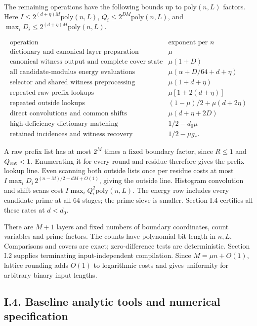 The remaining operations have the following bounds up to \(\mathrm{poly}(n,L)\) factors. Here \(I\le2^{(d+\eta)M}\mathrm{poly}(n,L)\), \(Q_i\le2^{DM}\mathrm{poly}(n,L)\), and \(\max_iD_i\le2^{(d+\eta)M}\mathrm{poly}(n,L)\).

\[
\begin{array}{c|c}
\text{operation}&\text{exponent per }n\\ \hline
\text{dictionary and canonical-layer preparation}&\mu\\
\text{canonical witness output and complete cover state}&\mu(1+D)\\
\text{all candidate-modulus energy evaluations}&\mu(\alpha+D/64+d+\eta)\\
\text{selector and shared witness preprocessing}&\mu(1+d+\eta)\\
\text{repeated raw prefix lookups}&\mu[1+2(d+\eta)]\\
\text{repeated outside lookups}&(1-\mu)/2+\mu(d+2\eta)\\
\text{direct convolutions and common shifts}&\mu(d+\eta+2D)\\
\text{high-deficiency dictionary matching}&1/2-d_0\mu\\
\text{retained incidences and witness recovery}&1/2-\mu g_*.
\end{array}
\tag{112}
\]

A raw prefix list has at most \(2^M\) times a fixed boundary factor, since \(R\le1\) and \(Q_{\rm ent}<1\). Enumerating it for every round and residue therefore gives the prefix-lookup line. Even scanning both outside lists once per residue costs at most \(I\max_iD_i\,2^{(n-M)/2-dM+O(1)}\), giving the outside line. Histogram convolution and shift scans cost \(I\max_iQ_i^2\mathrm{poly}(n,L)\). The energy row includes every candidate prime at all 64 stages; the prime sieve is smaller. Section I.4 certifies all these rates at \(d<d_0\).

There are \(M+1\) layers and fixed numbers of boundary coordinates, count variables and prime factors. The counts have polynomial bit length in \(n,L\). Comparisons and covers are exact; zero-difference tests are deterministic. Section I.2 supplies terminating input-independent compilation. Since \(M=\mu n+O(1)\), lattice rounding adds \(O(1)\) to logarithmic costs and gives uniformity for arbitrary binary input lengths.

\hypertarget{af-a9ec399514-i.4.-baseline-analytic-tools-and-numerical-specification}{%
\subsection{I.4. Baseline analytic tools and numerical specification}\label{af-a9ec399514-i.4.-baseline-analytic-tools-and-numerical-specification}}

